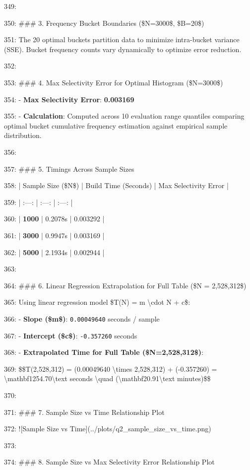\documentclass[11pt,a4paper]{article}
\begin{document}
{349:

350: \#\#\# 3. Frequency Bucket Boundaries (\$N=3000\$, \$B=20\$)

351: The 20 optimal buckets partition data to minimize intra-bucket variance (SSE). Bucket frequency counts vary dynamically to optimize error reduction.

352:

353: \#\#\# 4. Max Selectivity Error for Optimal Histogram (\$N=3000\$)

354: - \textbf{Max Selectivity Error}: \textbf{0.003169}

355: - \textbf{Calculation}: Computed across 10 evaluation range quantiles comparing optimal bucket cumulative frequency estimation against empirical sample distribution.

356:

357: \#\#\# 5. Timings Across Sample Sizes

358: | Sample Size (\$N\$) | Build Time (Seconds) | Max Selectivity Error |

359: | :---: | :---: | :---: |

360: | \textbf{1000} | 0.2078s | 0.003292 |

361: | \textbf{3000} | 0.9947s | 0.003169 |

362: | \textbf{5000} | 2.1934s | 0.002944 |

363:

364: \#\#\# 6. Linear Regression Extrapolation for Full Table (\$N = 2,528,312\$)

365: Using linear regression model \$T(N) = m \textbackslash{}cdot N + c\$:

366: - \textbf{Slope (\$m\$)}: \texttt{0.00049640} seconds / sample

367: - \textbf{Intercept (\$c\$)}: \texttt{-0.357260} seconds

368: - \textbf{Extrapolated Time for Full Table (\$N=2,528,312\$)}:

369:   \$\$T(2,528,312) = (0.00049640 \textbackslash{}times 2,528,312) + (-0.357260) = \textbackslash{}mathbf{1254.70\textbackslash{}text{ seconds}} \textbackslash{}quad (\textbackslash{}mathbf{20.91\textbackslash{}text{ minutes}})\$\$

370:

371: \#\#\# 7. Sample Size vs Time Relationship Plot

372: ![Sample Size vs Time](../plots/q2\_sample\_size\_vs\_time.png)

373:

374: \#\#\# 8. Sample Size vs Max Selectivity Error Relationship Plot

}
\end{document}
